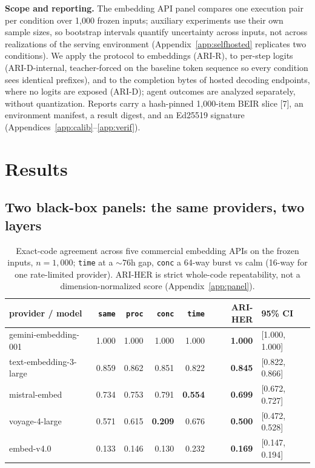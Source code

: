 \documentclass{article}
\begin{document}
\textbf{Scope and reporting.} The embedding API panel compares one execution pair per condition over 1{,}000 frozen inputs; auxiliary experiments use their own sample sizes, so bootstrap intervals quantify uncertainty across inputs, not across realizations of the serving environment (Appendix~\ref{app:selfhosted} replicates two conditions). We apply the protocol to embeddings (ARI-R), to per-step logits (ARI-D-internal, teacher-forced on the baseline token sequence so every condition sees identical prefixes), and to the completion bytes of hosted decoding endpoints, where no logits are exposed (ARI-D); agent outcomes are analyzed separately, without quantization. Reports carry a hash-pinned 1,000-item BEIR slice [7], an environment manifest, a result digest, and an Ed25519 signature (Appendices~\ref{app:calib}--\ref{app:verif}).

\vspace{-4pt}\section{Results}\label{sec3}\vspace{-2pt}

\vspace{-3pt}\subsection{Two black-box panels: the same providers, two layers}\label{sec:panels}\vspace{-1pt}

\begin{table}[H]
\centering\caption{Exact-code agreement across five commercial embedding APIs on the frozen inputs, $n=1{,}000$; \texttt{time} at a ${\sim}76$h gap, \texttt{conc} a 64-way burst vs calm (16-way for one rate-limited provider). ARI-HER is strict whole-code repeatability, not a dimension-normalized score (Appendix~\ref{app:panel}).}\label{tab:panel}\footnotesize\setlength{\tabcolsep}{4pt}
\begin{tabular}{lrrrrrl}
\toprule
provider / model & \texttt{same} & \texttt{proc} & \texttt{conc} & \texttt{time} & \textbf{ARI-HER} & 95\% CI \\
\midrule
gemini-embedding-001 & 1.000 & 1.000 & 1.000 & 1.000 & \textbf{1.000} & [1.000, 1.000] \\
text-embedding-3-large & 0.859 & 0.862 & 0.851 & 0.822 & \textbf{0.845} & [0.822, 0.866] \\
mistral-embed & 0.734 & 0.753 & 0.791 & \textbf{0.554} & \textbf{0.699} & [0.672, 0.727] \\
voyage-4-large & 0.571 & 0.615 & \textbf{0.209} & 0.676 & \textbf{0.500} & [0.472, 0.528] \\
embed-v4.0 & 0.133 & 0.146 & 0.130 & 0.232 & \textbf{0.169} & [0.147, 0.194] \\
\bottomrule
\end{tabular}
\end{table}
\end{document}
